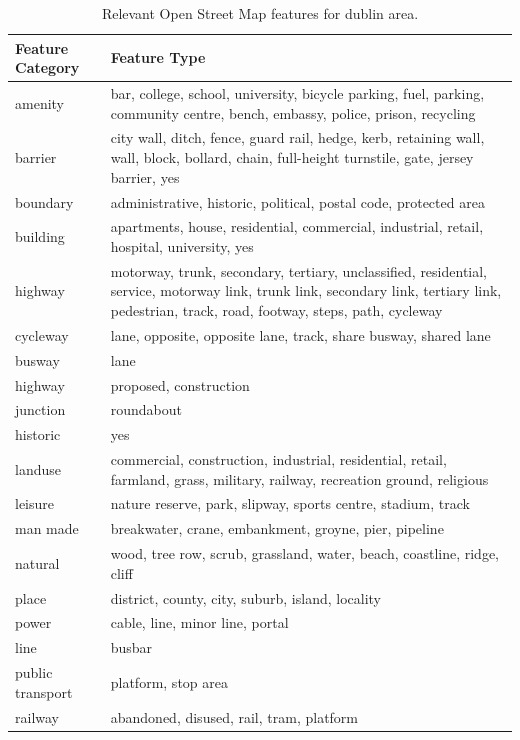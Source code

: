 \documentclass[]{elsarticle} %
\begin{document}
\begin{table}[t]

\caption{\label{tab:all-OSM-features}Relevant Open Street Map features for dublin area.}
\centering
\fontsize{8}{10}\selectfont
\begin{tabu} to 
\toprule
Feature Category & Feature Type\\
\midrule
amenity & bar, college, school, university, bicycle parking, fuel, parking, community centre, bench, embassy, police, prison, recycling\\
barrier & city wall, ditch, fence, guard rail, hedge, kerb, retaining wall, wall, block, bollard, chain, full-height turnstile, gate, jersey barrier, yes\\
boundary & administrative, historic, political, postal code, protected area\\
building & apartments, house, residential, commercial, industrial, retail, hospital, university, yes\\
highway & motorway, trunk, secondary, tertiary, unclassified, residential, service, motorway link, trunk link, secondary link, tertiary link, pedestrian, track, road, footway, steps, path, cycleway\\
cycleway & lane, opposite, opposite lane, track, share busway, shared lane\\
busway & lane\\
highway & proposed, construction\\
junction & roundabout\\
historic & yes\\
landuse & commercial, construction, industrial, residential, retail, farmland, grass, military, railway, recreation ground, religious\\
leisure & nature reserve, park, slipway, sports centre, stadium, track\\
man made & breakwater, crane, embankment, groyne, pier, pipeline\\
natural & wood, tree row, scrub, grassland, water, beach, coastline, ridge, cliff\\
place & district, county, city, suburb, island, locality\\
power & cable, line, minor line, portal\\
line & busbar\\
public transport & platform, stop area\\
railway & abandoned, disused, rail, tram, platform\\

\end{tabu}
\end{table}
\end{document}
